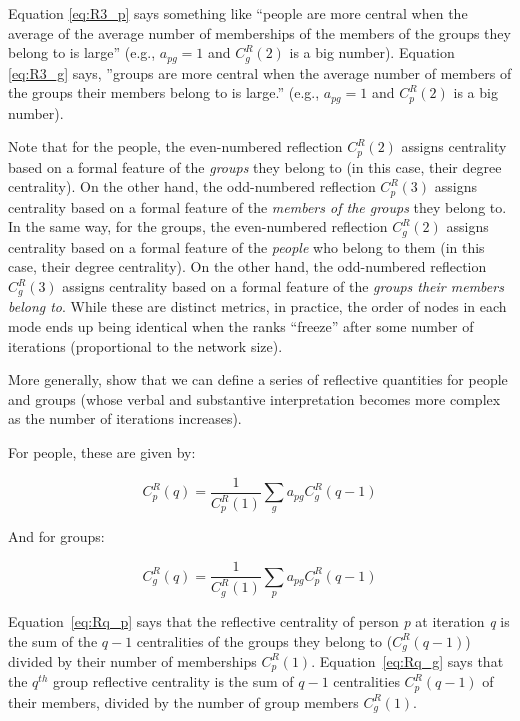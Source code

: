 \documentclass[a4paper,fleqn]{cas-sc}
\begin{document}
Equation \ref{eq:R3_p} says something like ``people are more central when the average of the average number of memberships of the members of the groups they belong to is large'' (e.g., $a_{pg} = 1$ and $C^R_g(2)$ is a big number). Equation \ref{eq:R3_g} says, ''groups are more central when the average number of members of the groups their members belong to is large.'' (e.g., $a_{pg} = 1$ and $C^R_p(2)$ is a big number).

Note that for the people, the even-numbered reflection $C^R_p(2)$ assigns centrality based on a formal feature of the \textit{groups} they belong to (in this case, their degree centrality). On the other hand, the odd-numbered reflection $C^R_p(3)$ assigns centrality based on a formal feature of the \textit{members of the groups} they belong to. In the same way, for the groups, the even-numbered reflection $C^R_g(2)$ assigns centrality based on a formal feature of the \textit{people} who belong to them (in this case, their degree centrality). On the other hand, the odd-numbered reflection $C^R_g(3)$ assigns centrality based on a formal feature of the \textit{groups their members belong to}. While these are distinct metrics, in practice, the order of nodes in each mode ends up being identical when the ranks ``freeze'' after some number of iterations (proportional to the network size). 

More generally, \citet{hidalgo2009building} show that we can define a series of reflective quantities for people and groups (whose verbal and substantive interpretation becomes more complex as the number of iterations increases). 

For people, these are given by:

\begin{equation}   
    C^R_p(q) = \frac{1}{C^R_p(1)}\sum_g a_{pg}C^R_g(q-1) 
   \label{eq:Rq_p}
\end{equation}

And for groups:

\begin{equation}
   C^R_g(q) = \frac{1}{C^R_g(1)}\sum_p a_{pg}C^R_p(q-1)
   \label{eq:Rq_g}
\end{equation}

Equation~\ref{eq:Rq_p} says that the reflective centrality of person \textit{p} at iteration \textit{q} is the sum of the $q-1$ centralities of the groups they belong to ($C^R_g(q-1)$) divided by their number of memberships $C^{R}_p(1)$. Equation~\ref{eq:Rq_g} says that the $q^{th}$ group reflective centrality is the sum of $q-1$ centralities $C^R_p(q-1)$ of their members, divided by the number of group members $C^R_g(1)$.
\end{document}
